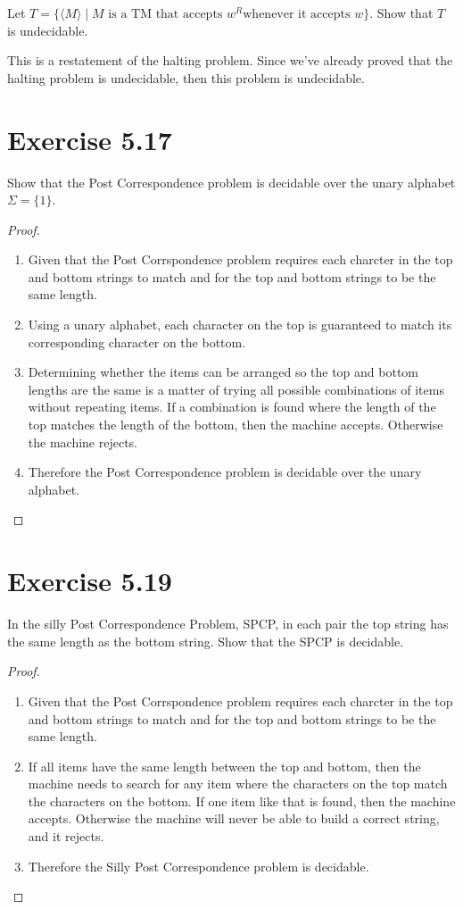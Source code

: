 \documentclass{article}
\newcommand{\where}{\mid}
\begin{document}
Let $T = \{ \langle M \rangle \where M \text{ is a TM that accepts } w^R \text{
whenever it accepts } w \}$. Show that $T$ is undecidable. 

This is a restatement of the halting problem. Since we've already proved that
the halting problem is undecidable, then this problem is undecidable.

\section{Exercise 5.17}

Show that the Post Correspondence problem is decidable over the unary alphabet
$\Sigma = \{ 1 \}$.

\begin{proof}
	\mbox{}
	\begin{enumerate}
	  \item Given that the Post Corrspondence problem requires each charcter in
	  the top and bottom strings to match and for the top and bottom strings to be
	  the same length.
	  \item Using a unary alphabet, each character on the top is guaranteed to
	  match its corresponding character on the bottom. 
	  \item Determining whether the items can be arranged so the top and bottom
	  lengths are the same is a matter of trying all possible combinations of
	  items without repeating items. If a combination is found where the length of
	  the top matches the length of the bottom, then the machine accepts. Otherwise
	  the machine rejects.
	  \item Therefore the Post Correspondence problem is decidable over the unary
	  alphabet. \qedhere
	\end{enumerate}
\end{proof}

\section{Exercise 5.19}

In the silly Post Correspondence Problem, SPCP, in each pair the top string has
the same length as the bottom string. Show that the SPCP is decidable.

\begin{proof}
	\mbox{}
	\begin{enumerate}
	  \item Given that the Post Corrspondence problem requires each charcter in
	  the top and bottom strings to match and for the top and bottom strings to be
	  the same length.
	  \item If all items have the same length between the top and bottom, then the
	  machine needs to search for any item where the characters on the top match
	  the characters on the bottom. If one item like that is found, then the
	  machine accepts. Otherwise the machine will never be able to build a correct
	  string, and it rejects.
	  \item Therefore the Silly Post Correspondence problem is decidable. \qedhere
	\end{enumerate}
\end{proof}
\end{document}
